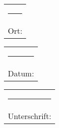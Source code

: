 \documentclass[
  fontsize=12pt,
  a4paper,  %
  twoside,  %
  bibliography=totoc,
  headsepline,
  cleardoublepage=empty,
  parskip=half,
  draft=false
]{scrbook}
\begin{document}
\vspace{2cm}

\hfill
\begin{tabular}[t]{c}
	\rule{10em}{0.4pt}\\ Ort:
\end{tabular}
\hfill
\begin{tabular}[t]{c}
	\rule{10em}{0.4pt}\\ Datum:
\end{tabular}
\hfill
\begin{tabular}[t]{c}
	\rule{10em}{0.4pt}\\ Unterschrift:
\end{tabular}
\hfill
\hfill\strut

\pagestyle{empty}
\renewcommand*{\chapterpagestyle}{empty}
\end{document}
